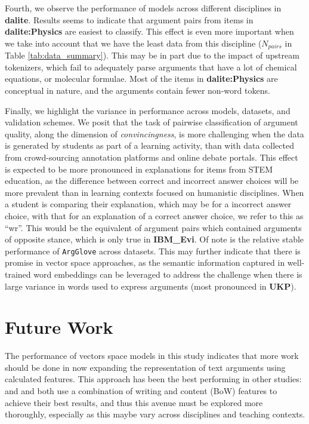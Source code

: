 \documentclass[runningheads]{llncs}
\begin{document}
Fourth, we observe the performance of models across different disciplines in 
\textbf{dalite}. 
Results seems to indicate that argument pairs from items in 
\textbf{dalite:Physics} are easiest to classify.
This effect is even more important when we take into account that we have the 
least data from this discipline ($N_{pairs}$ in Table \ref{tab:data_summary}).
This may be in part due to the impact of upstream tokenizers, which fail to 
adequately parse arguments that have a lot of chemical equations, or molecular 
formulae.
Most of the items in \textbf{dalite:Physics} are conceptual in nature, and the 
arguments contain fewer non-word tokens.
 
Finally, we highlight the variance in performance across models, datasets, and 
validation schemes. We posit that the task of pairwise classification of 
argument quality, along the dimension of \textit{convincingness}, is more 
challenging when the data is generated by students as part of a learning 
activity, than with data collected from crowd-sourcing annotation platforms and 
online debate portals. 
This effect is expected to be more pronounced in explanations for items from 
STEM education, as the difference between correct and incorrect answer choices 
will be more prevalent than in learning contexts focused on humanistic 
disciplines.
When a student is comparing their explanation, which may be for a incorrect 
answer choice, with that for an explanation of a correct answer choice, we 
refer to this as ``wr''.
This would be the equivalent of argument pairs which contained arguments of 
opposite stance, which is only true in \textbf{IBM\_Evi}.  
Of note is the relative stable performance of \verb|ArgGlove| across datasets. 
This may further indicate that there is promise in vector space approaches, as 
the semantic information captured in well-trained word embeddings can be 
leveraged to address the challenge when there is large variance in words used 
to express arguments (most pronounced in \textbf{UKP}).


\section{Future Work}

The performance of vectors space models in this study indicates that more work 
should be done in now expanding the representation of text arguments using 
calculated features.
This approach has been the best performing in other studies: 
\cite{louis_what_2013} and \cite{nguyen_computational_2015} and both use a 
combination of writing and content (BoW) features to achieve their best 
results, and thus this avenue must be explored more thoroughly, especially as 
this maybe vary across disciplines and teaching contexts. 
\end{document}
